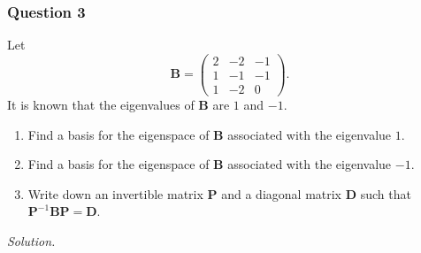 \documentclass[12pt]{article}
\begin{document}
\subsubsection*{Question 3}
Let
\[
\mathbf{B} = \begin{pmatrix}
2 & -2 & -1 \\
1 & -1 & -1 \\
1 & -2 & 0
\end{pmatrix}.
\]
It is known that the eigenvalues of \(\mathbf{B}\) are \(1\) and \(-1\).
\begin{enumerate}[label=\textbf{(\alph*)}]
\itemsep 0em
    \item Find a basis for the eigenspace of \(\mathbf{B}\) associated with the eigenvalue \(1\).
    \item Find a basis for the eigenspace of \(\mathbf{B}\) associated with the eigenvalue \(-1\).
    \item Write down an invertible matrix \(\mathbf{P}\) and a diagonal matrix \(\mathbf{D}\) such that \(\mathbf{P}^{-1}\mathbf{BP} = \mathbf{D}\).
\end{enumerate}
\noindent\emph{Solution.}
\end{document}
